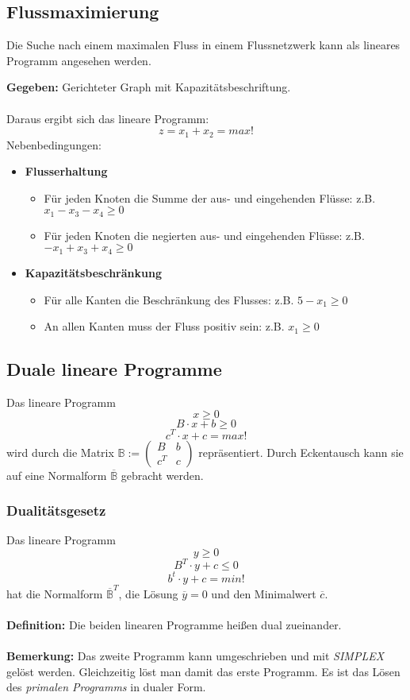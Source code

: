 \subsection{Flussmaximierung}
Die Suche nach einem maximalen Fluss in einem Flussnetzwerk kann als lineares Programm angesehen werden.

\textbf{Gegeben:} Gerichteter Graph mit Kapazitätsbeschriftung.
\\\\
Daraus ergibt sich das lineare Programm:
\[z = x_1 + x_2 = max!\]
Nebenbedingungen:
\begin{itemize}
	\item \textbf{Flusserhaltung}
	\begin{itemize}
		\item Für jeden Knoten die Summe der aus- und eingehenden Flüsse: z.B. \(x_1-x_3-x_4 \geq 0\)
		\item Für jeden Knoten die negierten aus- und eingehenden Flüsse: z.B. \(-x_1+x_3+x_4 \geq 0\)
	\end{itemize}
	\item \textbf{Kapazitätsbeschränkung}
	\begin{itemize}
		\item Für alle Kanten die Beschränkung des Flusses: z.B. \(5-x_1 \geq 0\)
		\item An allen Kanten muss der Fluss positiv sein: z.B. \(x_1 \geq 0\)
	\end{itemize}
\end{itemize}


\subsection{Duale lineare Programme}
Das lineare Programm
\[x \geq 0\]
\[B\cdot x + b \geq 0\]
\[c^T \cdot x + c = max!\]
wird durch die Matrix \(\mathbb{B} := \begin{pmatrix} B & b \\ c^T & c\end{pmatrix}\) repräsentiert. Durch Eckentausch kann sie auf eine Normalform \(\overline{\mathbb{B}}\) gebracht werden.

\subsubsection{Dualitätsgesetz}
Das lineare Programm
\[y \geq 0\]
\[B^T \cdot y + c \leq 0\]
\[b^t \cdot y + c = min!\]
hat die Normalform \(\overline{\mathbb{B}}^T\), die Lösung \(\overline{y}=0\) und den Minimalwert \(\overline{c}\).
\\\\
\textbf{Definition:} Die beiden linearen Programme heißen dual zueinander.
\\\\
\textbf{Bemerkung:} Das zweite Programm kann umgeschrieben und mit \textit{SIMPLEX} gelöst werden. Gleichzeitig löst man damit das erste Programm. Es ist das Lösen des \textit{primalen Programms} in dualer Form.


